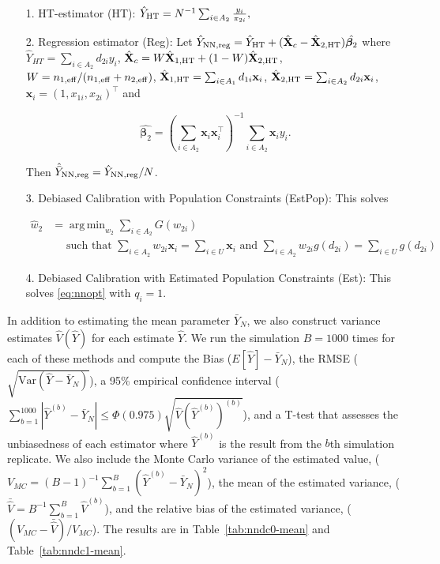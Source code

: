 \documentclass[12pt]{article}
\DeclareMathOperator*{\argmin}{arg\,min}
\newcommand{\Var}{{\text{Var}}}
\renewcommand{\bf}[1]{\mathbf{#1}}
\begin{document}
\begin{itemize}
  \item[1.] HT-estimator (HT): $\hat Y_{\rm HT} = N^{-1} \sum_{i \in A_2}
    \frac{y_i}{\pi_{2i}},$
  \item[2.] Regression estimator (Reg): Let $\hat Y_{\rm NN, reg} = \hat Y_{\rm HT} + (
  \hat{\bf X}_c - \hat{\bf X}_{2, \rm HT}) \hat{\bm \beta_2}$ where $\hat Y_{HT} =
\sum_{i \in A_2} d_{2i} y_i$, $\hat{\bf X}_c = W \hat{\bf X}_{1, \rm HT} + (1 -
W)\hat{\bf X}_{2, \rm HT}$, $W = n_{1,\rm{eff}} / (n_{1,\rm{eff}} + n_{2, \rm{eff}})$,
$\hat{\bf X}_{1, \rm HT} = \sum_{i \in A_1} d_{1i} \bf x_{i}$, $\hat{\bf X}_{2,
    \rm HT} = \sum_{i \in A_2} d_{2i} \bf x_{i}$, $\bf x_i = (1, x_{1i}, x_{2i})^\top$
    and 

    $$ \hat{\bm \beta_2} = \left(\sum_{i \in A_2} \bf x_i \bf x_i^\top\right)^{-1}
    \sum_{i \in A_2} \bf x_i y_i.$$

    Then $\hat{\bar Y}_{\rm NN, reg} = \hat Y_{\rm NN, reg} / N$.
  \item[3.] Debiased Calibration with Population Constraints (EstPop): This 
    solves 

  \begin{align*}
    \hat w_2 &= \argmin_{w_2} \sum_{i \in A_2} G(w_{2i}) \\
    &\quad\text{ such that } 
  \sum_{i \in A_2} w_{2i} \bf x_i = \sum_{i \in U} \bf x_i \text{ and } 
  \sum_{i \in A_2} w_{2i} g(d_{2i}) = \sum_{i \in U} g(d_{2i})
  \end{align*}

  \item[4.] Debiased Calibration with Estimated Population Constraints (Est):
    This solves \eqref{eq:nnopt} with $q_i = 1$.
\end{itemize}

In addition to estimating the mean parameter $\bar Y_N$, we also construct
variance estimates $\hat V(\hat Y)$ for each estimate $\hat Y$.
We run the simulation $B = 1000$ times for each of these methods and compute the
Bias ($E[\hat Y] - \bar Y_N$), the RMSE ($\sqrt{\Var(\hat Y - \bar Y_N)}$), a 95\%
empirical confidence interval ($\sum_{b = 1}^{1000} |\hat Y^{(b)} - \bar Y_N| \leq 
\Phi(0.975)\sqrt{\hat V(\hat Y^{(b)})^{(b)}}$), and a T-test that assesses the
unbiasedness of each estimator where $\hat Y^{(b)}$ is the result from the $b$th
simulation replicate. We also include the Monte Carlo variance of the estimated
value, ($V_{MC} = (B - 1)^{-1} \sum_{b = 1}^B (\hat Y^{(b)} - \bar Y_N)^2$), the
mean of the estimated variance, 
($\bar{\hat V} = B^{-1} \sum_{b = 1}^B \hat V^{(b)}$), and the relative bias of
the estimated variance, ($(V_{MC} - \bar{\hat V}) / V_{MC}$). The results are in
Table~\ref{tab:nndc0-mean} and Table~\ref{tab:nndc1-mean}.
\end{document}
